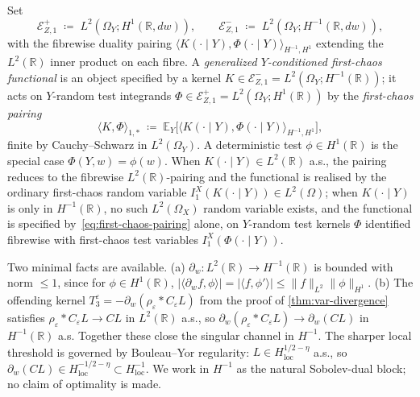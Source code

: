 \documentclass[EJP]{ejpecp}
\newcommand{\R}{\mathbb{R}}
\renewcommand{\E}{\mathbb{E}}
\newcommand{\Energy}{\mathcal{E}}
\newcommand{\IBM}{Z}
\begin{document}
\begin{definition}\label{def:first-chaos-block}
Set
\[
 \Energy_{\IBM,1}^{+}\;\coloneqq\;L^{2}(\Omega_Y;H^{1}(\R,dw)),
 \qquad
 \Energy_{\IBM,1}^{-}\;\coloneqq\;L^{2}(\Omega_Y;H^{-1}(\R,dw)),
\]
with the fibrewise duality pairing
$\langle K(\cdot\mid Y),\Phi(\cdot\mid Y)\rangle_{H^{-1},H^{1}}$
extending the $L^{2}(\R)$ inner product on each fibre. A
\emph{generalized $Y$-conditioned first-chaos functional} is an
object specified by a kernel
$K\in\Energy_{\IBM,1}^{-}=L^{2}(\Omega_Y;H^{-1}(\R))$; it acts on
$Y$-random test integrands $\Phi\in\Energy_{\IBM,1}^{+}=L^{2}(\Omega_Y;H^{1}(\R))$
by the \emph{first-chaos pairing}
\begin{equation}\label{eq:first-chaos-pairing}
 \bigl\langle K,\Phi\bigr\rangle_{1,*}
 \;\coloneqq\;\E_{Y}\!\bigl[\langle K(\cdot\mid Y),\Phi(\cdot\mid Y)\rangle_{H^{-1},H^{1}}\bigr],
\end{equation}
finite by Cauchy--Schwarz in $L^{2}(\Omega_Y)$. A deterministic test
$\phi\in H^{1}(\R)$ is the special case $\Phi(Y,w)=\phi(w)$. When
$K(\cdot\mid Y)\in L^{2}(\R)$ a.s., the pairing reduces to the
fibrewise $L^{2}(\R)$-pairing and the functional is realised by the
ordinary first-chaos random variable
$I_1^X(K(\cdot\mid Y))\in L^{2}(\Omega)$; when $K(\cdot\mid Y)$ is
only in $H^{-1}(\R)$, no such $L^{2}(\Omega_X)$ random variable
exists, and the functional is specified by~\eqref{eq:first-chaos-pairing}
alone, on $Y$-random test kernels $\Phi$ identified fibrewise with
first-chaos test variables $I_1^X(\Phi(\cdot\mid Y))$.
\end{definition}

\begin{remark}\label{rem:why-Hminus1}
Two minimal facts are available. (a) $\partial_w\colon L^{2}(\R)\to H^{-1}(\R)$
is bounded with norm $\le 1$, since for $\phi\in H^{1}(\R)$,
$|\langle\partial_w f,\phi\rangle|=|\langle f,\phi'\rangle|\le
\|f\|_{L^{2}}\|\phi\|_{H^{1}}$. (b) The offending kernel
$T_3^{\varepsilon}=-\partial_w(\rho_\varepsilon*C_\varepsilon L)$ from
the proof of \cref{thm:var-divergence} satisfies
$\rho_\varepsilon*C_\varepsilon L\to CL$ in $L^{2}(\R)$ a.s., so
$\partial_w(\rho_\varepsilon*C_\varepsilon L)\to\partial_w(CL)$ in
$H^{-1}(\R)$ a.s. Together these close the singular channel in
$H^{-1}$. The sharper local threshold is governed by Bouleau--Yor
regularity: $L\in H^{1/2-\eta}_{\mathrm{loc}}$ a.s., so
$\partial_w(CL)\in H^{-1/2-\eta}_{\mathrm{loc}}\subset H^{-1}_{\mathrm{loc}}$.
We work in $H^{-1}$ as the natural Sobolev-dual block; no claim of
optimality is made.
\end{remark}
\end{document}
